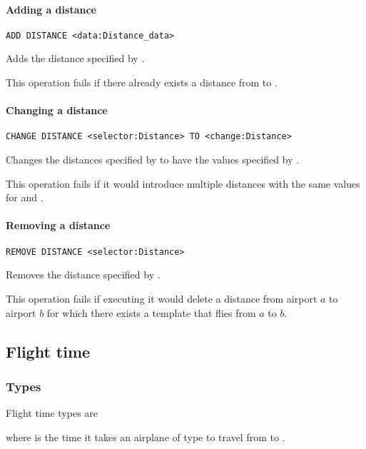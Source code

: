 \paragraph{Adding a distance}
\begin{operation}
  \lstinline{ADD DISTANCE <data:Distance_data>}
  \label{op:add_distance}
\end{operation}
Adds the distance specified by .

This operation fails if there already exists a distance from  to
.

\paragraph{Changing a distance}
\begin{operation}
  \lstinline{CHANGE DISTANCE <selector:Distance> TO <change:Distance>}
  \label{op:change_distance}
\end{operation}
Changes the distances specified by  to have the values specified
by .

This operation fails if it would introduce multiple distances with the same
values for  and .

\paragraph{Removing a distance}
\begin{operation}
  \lstinline{REMOVE DISTANCE <selector:Distance>}
  \label{op:remove_distance}
\end{operation}
Removes the distance specified by .

This operation fails if executing it would delete a distance from airport $a$ to
airport $b$ for which there exists a template that flies from $a$ to $b$.

\subsection{Flight time}
\subsubsection{Types}
Flight time types are
\begin{description}
  \item[] 
  \item[] 
\end{description}
where  is the time it takes an airplane of type 
to travel from  to .

